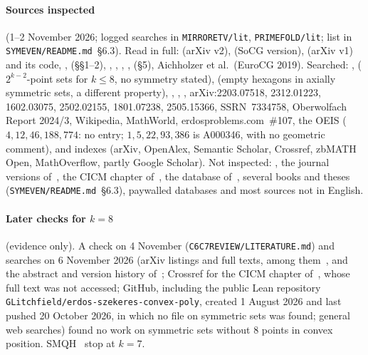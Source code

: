\documentclass[10pt]{article}
\theoremstyle{definition}
\theoremstyle{remark}
\newcommand{\dirn}[1]{{\upshape\nolinkurl{#1}}}
\begin{document}
\paragraph{Sources inspected} (1--2 November 2026; logged searches in \dirn{MIRRORETV/lit}, \dirn{PRIMEFOLD/lit}; list in
\dirn{SYMEVEN/README.md}~\S6.3).
Read in full: \cite{Bae25} (arXiv v2), \cite{BB25} (SoCG version), \cite{SMQH25} (arXiv v1) and its code, \cite{Mac25},
\cite{ES61} (\S\S1--2), \cite{MS00}, \cite{BK01}, \cite{TV05}, \cite{BV15}, \cite{SP06} (\S5), Aichholzer et al.\
(EuroCG 2019). Searched: \cite{KPH26}, \cite{GGTW25} ($2^{k-2}$-point sets for $k\le8$, no symmetry stated),
\cite{KK26} (empty hexagons in axially symmetric sets, a different property), \cite{Dum25}, \cite{Sch26}, \cite{MV16},
arXiv:2203.07518, 2312.01223, 1602.03075, 2502.02155, 1801.07238, 2505.15366, SSRN~7334758, Oberwolfach Report 2024/3,
Wikipedia, MathWorld, erdosproblems.com~\#107, the OEIS ($4,12,46,188,774$: no entry; $1,5,22,93,386$ is A000346, with no
geometric comment), and indexes (arXiv, OpenAlex, Semantic Scholar, Crossref, zbMATH Open, MathOverflow, partly Google
Scholar). Not inspected: \cite{ETV96}, the journal versions of~\cite{Bae25,BV17,BB25}, the CICM chapter
of~\cite{SMQH25}, the database of~\cite{AAK02}, several books and theses (\dirn{SYMEVEN/README.md}~\S6.3), paywalled
databases and most sources not in English.

\paragraph{Later checks for $k=8$} (evidence only). A check on 4 November (\dirn{C6C7REVIEW/LITERATURE.md}) and searches
on 6 November 2026 (arXiv listings and full texts, among them~\cite{KPH26,KK26}, and the abstract and version history
of~\cite{Dum25}; Crossref for the CICM chapter
of~\cite{SMQH25}, whose full text was not accessed; GitHub, including the public Lean repository
\texttt{GLitchfield/erdos-szekeres-convex-poly}, created 1 August 2026 and last pushed 20 October 2026, in which no file
on symmetric sets was found; general web searches) found no work on symmetric sets without $8$ points in convex position.
SMQH~\cite{SMQH25} stop at $k=7$.
\end{document}
